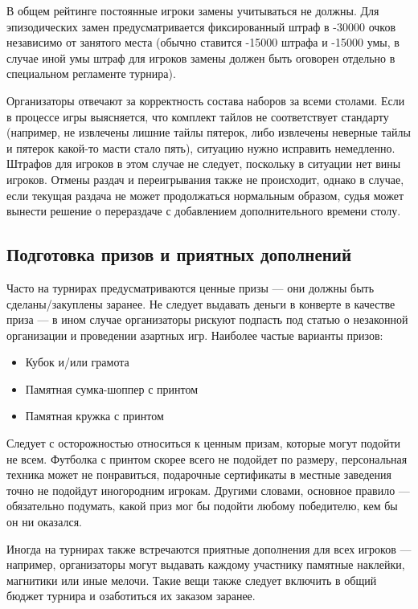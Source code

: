 В общем рейтинге постоянные игроки замены учитываться не должны. Для эпизодических замен предусматривается фиксированный штраф в -30000 очков независимо от занятого места (обычно ставится -15000 штрафа и -15000 умы, в случае иной умы штраф для игроков замены должен быть оговорен отдельно в специальном регламенте турнира).

Организаторы отвечают за корректность состава наборов за всеми столами. Если в процессе игры выясняется, что комплект тайлов не соответствует стандарту (например, не извлечены лишние тайлы пятерок, либо извлечены неверные тайлы и пятерок какой-то масти стало пять), ситуацию нужно исправить немедленно. Штрафов для игроков в этом случае не следует, поскольку в ситуации нет вины игроков. Отмены раздач и переигрывания также не происходит, однако в случае, если текущая раздача не может продолжаться нормальным образом, судья может вынести решение о перераздаче с добавлением дополнительного времени столу.

\subsection{Подготовка призов и приятных дополнений}

Часто на турнирах предусматриваются ценные призы --- они должны быть сделаны/закуплены заранее. Не следует выдавать деньги в конверте в качестве приза --- в ином случае организаторы рискуют подпасть под статью о незаконной организации и проведении азартных игр. Наиболее частые варианты призов:
\begin{itemize}
	\item Кубок и/или грамота
	\item Памятная сумка-шоппер с принтом
	\item Памятная кружка с принтом
\end{itemize}

Следует с осторожностью относиться к ценным призам, которые могут подойти не всем. Футболка с принтом скорее всего не подойдет по размеру, персональная техника может не понравиться, подарочные сертификаты в местные заведения точно не подойдут иногородним игрокам. Другими словами, основное правило --- обязательно подумать, какой приз мог бы подойти любому победителю, кем бы он ни оказался.

Иногда на турнирах также встречаются приятные дополнения для всех игроков --- например, организаторы могут выдавать каждому участнику памятные наклейки, магнитики или иные мелочи. Такие вещи также следует включить в общий бюджет турнира и озаботиться их заказом заранее.

